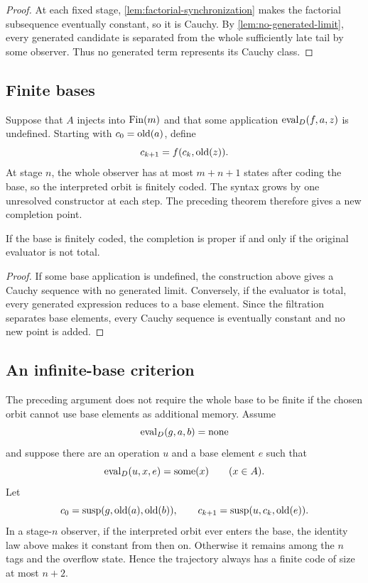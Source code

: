 \begin{proof}
At each fixed stage, \cref{lem:factorial-synchronization} makes the factorial
subsequence eventually constant, so it is Cauchy.  By
\cref{lem:no-generated-limit}, every generated candidate is separated from the
whole sufficiently late tail by some observer.  Thus no generated term
represents its Cauchy class.
\end{proof}

\subsection{Finite bases}

Suppose that $A$ injects into $\operatorname{Fin}(m)$ and that some application
$\operatorname{eval}_D(f,a,z)$ is undefined.  Starting with $c_0=\operatorname{old}(a)$, define
\[
  c_{k+1}=f(c_k,\operatorname{old}(z)).
\]
At stage $n$, the whole observer has at most $m+n+1$ states after coding the
base, so the interpreted orbit is finitely coded.  The syntax grows by one
unresolved constructor at each step.  The preceding theorem therefore gives a
new completion point.

\begin{theorem}
\label{prop:proper-completion}
If the base is finitely coded, the completion is proper if and only if the
original evaluator is not total.
\end{theorem}

\begin{proof}
If some base application is undefined, the construction above gives a Cauchy
sequence with no generated limit.  Conversely, if the evaluator is total, every
generated expression reduces to a base element.  Since the filtration separates
base elements, every Cauchy sequence is eventually constant and no new point is
added.
\end{proof}

\subsection{An infinite-base criterion}

The preceding argument does not require the whole base to be finite if the
chosen orbit cannot use base elements as additional memory.  Assume
\[
  \operatorname{eval}_D(g,a,b)=\operatorname{none}
\]
and suppose there are an operation $u$ and a base element $e$ such that
\[
  \operatorname{eval}_D(u,x,e)=\operatorname{some}(x)
  \qquad (x\in A).
\]
Let
\[
  c_0=\operatorname{susp}(g,\operatorname{old}(a),\operatorname{old}(b)),
  \qquad
  c_{k+1}=\operatorname{susp}(u,c_k,\operatorname{old}(e)).
\]
In a stage-$n$ observer, if the interpreted orbit ever enters the base, the
identity law above makes it constant from then on.  Otherwise it remains among
the $n$ tags and the overflow state.  Hence the trajectory always has a finite
code of size at most $n+2$.

